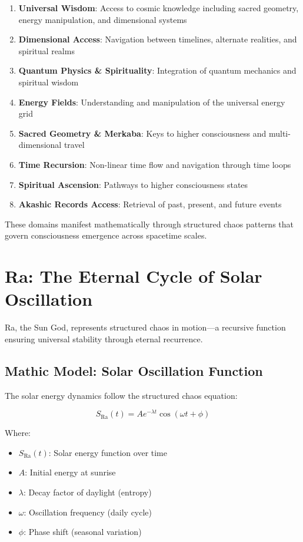 \documentclass[12pt]{article}
\begin{document}
\begin{enumerate}
    \item \textbf{Universal Wisdom}: Access to cosmic knowledge including sacred geometry, energy manipulation, and dimensional systems
    \item \textbf{Dimensional Access}: Navigation between timelines, alternate realities, and spiritual realms
    \item \textbf{Quantum Physics \& Spirituality}: Integration of quantum mechanics and spiritual wisdom
    \item \textbf{Energy Fields}: Understanding and manipulation of the universal energy grid
    \item \textbf{Sacred Geometry \& Merkaba}: Keys to higher consciousness and multi-dimensional travel
    \item \textbf{Time Recursion}: Non-linear time flow and navigation through time loops
    \item \textbf{Spiritual Ascension}: Pathways to higher consciousness states
    \item \textbf{Akashic Records Access}: Retrieval of past, present, and future events
\end{enumerate}

These domains manifest mathematically through structured chaos patterns that govern consciousness emergence across spacetime scales.

\section{Ra: The Eternal Cycle of Solar Oscillation}

Ra, the Sun God, represents structured chaos in motion—a recursive function ensuring universal stability through eternal recurrence.

\subsection{Mathic Model: Solar Oscillation Function}

The solar energy dynamics follow the structured chaos equation:

\[S_{\text{Ra}}(t) = A e^{-\lambda t} \cos(\omega t + \phi)\]

Where:
\begin{itemize}
    \item \(S_{\text{Ra}}(t)\): Solar energy function over time
    \item \(A\): Initial energy at sunrise
    \item \(\lambda\): Decay factor of daylight (entropy)
    \item \(\omega\): Oscillation frequency (daily cycle)
    \item \(\phi\): Phase shift (seasonal variation)
\end{itemize}
\end{document}
